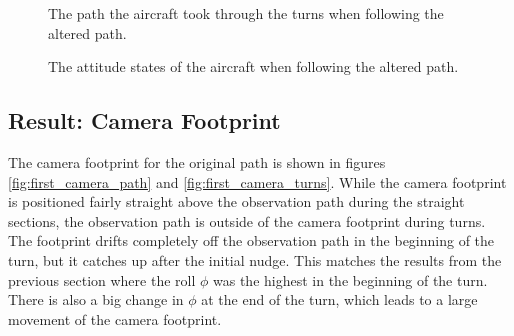\begin{figure}[]
    \centering
    \caption{The path the aircraft took through the turns when following the altered path.}
	\label{fig:second_run_turns}
\end{figure}

\begin{figure}[]
    \centering
    \caption{The attitude states of the aircraft when following the altered path.}
	\label{fig:second_run_states}
\end{figure}


\subsection{Result: Camera Footprint}

The camera footprint for the original path is shown in figures \ref{fig:first_camera_path} and \ref{fig:first_camera_turns}. While the camera footprint is positioned fairly straight above the observation path during the straight sections, the observation path is outside of the camera footprint during turns. The footprint drifts completely off the observation path in the beginning of the turn, but it catches up after the initial nudge. This matches the results from the previous section where the roll $\phi$ was the highest in the beginning of the turn. There is also a big change in $\phi$ at the end of the turn, which leads to a large movement of the camera footprint.

